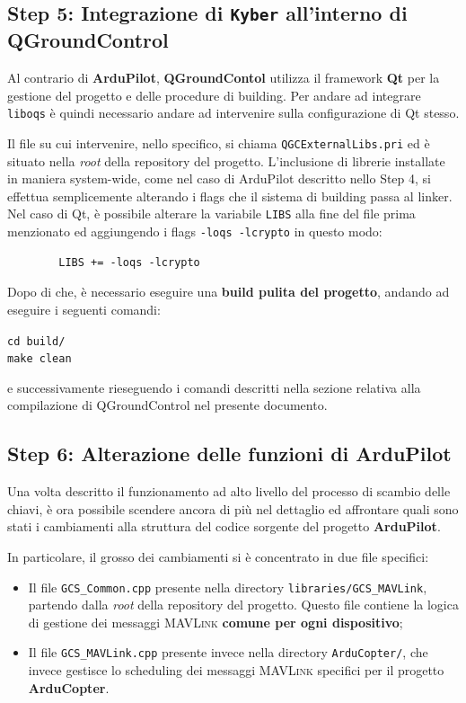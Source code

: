 \documentclass[a4paper, 12pt, oneside]{article}
\theoremstyle{definition}
\begin{document}
\newpage
\subsection{Step 5: Integrazione di \texttt{Kyber} all'interno di QGroundControl}

Al contrario di \textbf{ArduPilot}, \textbf{QGroundContol} utilizza il framework \textbf{Qt} per la gestione del progetto e delle procedure di building. Per andare ad integrare \texttt{liboqs} è quindi necessario andare ad intervenire sulla configurazione di Qt stesso. 

Il file su cui intervenire, nello specifico, si chiama \texttt{QGCExternalLibs.pri} ed è situato nella \textit{root} della repository del progetto. L'inclusione di librerie installate in maniera system-wide, come nel caso di ArduPilot descritto nello Step 4, si effettua semplicemente alterando i flags che il sistema di building passa al linker. Nel caso di Qt, è possibile alterare la variabile \texttt{LIBS} alla fine del file prima menzionato ed aggiungendo i flags \texttt{-loqs -lcrypto} in questo modo:

    \begin{verbatim}
        LIBS += -loqs -lcrypto
    \end{verbatim}

Dopo di che, è necessario eseguire una \textbf{build pulita del progetto}, andando ad eseguire i seguenti comandi:

\begin{center}
    \texttt{cd build/} \\
    \texttt{make clean}
\end{center}

e successivamente rieseguendo i comandi descritti nella sezione relativa alla compilazione di QGroundControl nel presente documento.

\newpage
\subsection{Step 6: Alterazione delle funzioni di \textbf{ArduPilot}}
Una volta descritto il funzionamento ad alto livello del processo di scambio delle chiavi, è ora possibile scendere ancora di più nel dettaglio ed affrontare quali sono stati i cambiamenti alla struttura del codice sorgente del progetto \textbf{ArduPilot}.

In particolare, il grosso dei cambiamenti si è concentrato in due file specifici:

\begin{itemize}
    \item Il file \texttt{GCS\_Common.cpp} presente nella directory \texttt{libraries/GCS\_MAVLink}, partendo dalla \textit{root} della repository del progetto. Questo file contiene la logica di gestione dei messaggi \textsc{MAVLink} \textbf{comune per ogni dispositivo};
    \item Il file \texttt{GCS\_MAVLink.cpp} presente invece nella directory \texttt{ArduCopter/}, che invece gestisce lo scheduling dei messaggi \textsc{MAVLink} specifici per il progetto \textbf{ArduCopter}.
\end{itemize}
\end{document}
